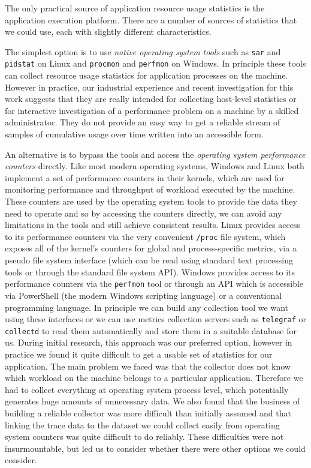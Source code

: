 The only practical source of application resource usage statistics is the application execution platform.  There are a number of sources of statistics that we could use, each with slightly different characteristics.

The simplest option is to use \emph{native operating system tools} such as \texttt{sar} and \texttt{pidstat} on Linux and \texttt{procmon} and \texttt{perfmon} on Windows.  In principle these tools can collect resource usage statistics for application processes on the machine.  However in practice, our industrial experience and recent investigation for this work suggests that they are really intended for collecting host-level statistics or for interactive investigation of a performance problem on a machine by a skilled administrator.  They do not provide an easy way to get a reliable stream of samples of cumulative usage over time written into an accessible form.

An alternative is to bypass the tools and access the \emph{operating system performance counters} directly.  Like most modern operating systems, Windows and Linux both implement a set of performance counters in their kernels, which are used for monitoring performance and throughput of workload executed by the machine.  These counters are used by the operating system tools to provide the data they need to operate and so by accessing the counters directly, we can avoid any limitations in the tools and still achieve consistent results.  Linux provides access to its performance counters via the very convenient \texttt{{/proc}} file system, which exposes all of the kernel's counters for global and process-specific metrics, via a pseudo file system interface (which can be read using standard text processing tools or through the standard file system API).  Windows provides access to its performance counters via the \texttt{perfmon} tool or through an API which is accessible via PowerShell (the modern Windows scripting language) or a conventional programming language.  In principle we can build any collection tool we want using these interfaces or we can use metrics collection servers such as \texttt{telegraf} or \texttt{collectd} \cite{telegraf2018, collectd2018} to read them automatically and store them in a suitable database for us.  During initial research, this approach was our preferred option, however in practice we found it quite difficult to get a usable set of statistics for our application.  The main problem we faced was that the collector does not know which workload on the machine belongs to a particular application.  Therefore we had to collect everything at operating system process level, which potentially generates huge amounts of unnecessary data.  We also found that the business of building a reliable collector was more difficult than initially assumed and that linking the trace data to the dataset we could collect easily from operating system counters was quite difficult to do reliably.  These difficulties were not insurmountable, but led us to consider whether there were other options we could consider.

